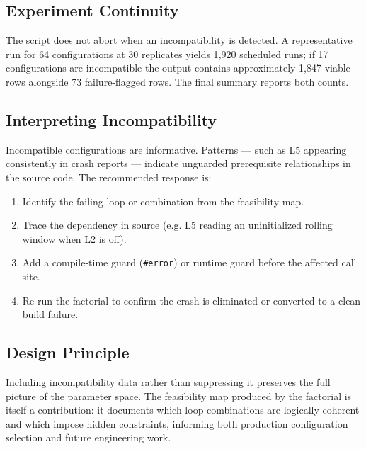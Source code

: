 \subsection{Experiment Continuity}

The script does not abort when an incompatibility is detected. A representative
run for 64 configurations at 30 replicates yields 1{,}920 scheduled runs; if
17 configurations are incompatible the output contains approximately 1{,}847
viable rows alongside 73 failure-flagged rows. The final summary reports both
counts.

\subsection{Interpreting Incompatibility}

Incompatible configurations are informative. Patterns — such as L5 appearing
consistently in crash reports — indicate unguarded prerequisite relationships
in the source code. The recommended response is:

\begin{enumerate}
  \item Identify the failing loop or combination from the feasibility map.
  \item Trace the dependency in source (e.g. L5 reading an uninitialized
        rolling window when L2 is off).
  \item Add a compile-time guard (\texttt{\#error}) or runtime guard before
        the affected call site.
  \item Re-run the factorial to confirm the crash is eliminated or converted
        to a clean build failure.
\end{enumerate}

\subsection{Design Principle}

Including incompatibility data rather than suppressing it preserves the full
picture of the parameter space. The feasibility map produced by the factorial
is itself a contribution: it documents which loop combinations are logically
coherent and which impose hidden constraints, informing both production
configuration selection and future engineering work.


